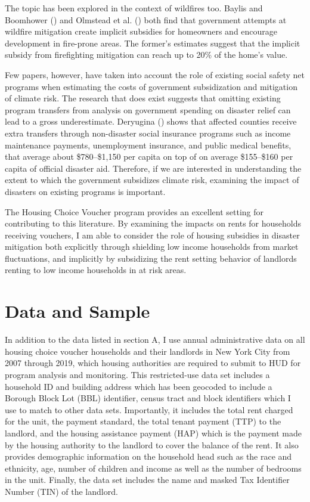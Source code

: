 \documentclass[12pt]{article}
\begin{document}
{{{{{The topic has been explored in the context of wildfires too. Baylis and Boomhower (\citeyear{baylis_moral_2019}) and Olmstead et al. (\citeyear{olmstead_wildland_2012}) both find that government attempts at wildfire mitigation create implicit subsidies for homeowners and encourage development in fire-prone areas. The former's estimates suggest that the implicit subsidy from firefighting mitigation can reach up to 20\% of the home's value.

Few papers, however, have taken into account the role of existing social safety net programs when estimating the costs of government subsidization and mitigation of climate risk. The research that does exist suggests that omitting existing program transfers from analysis on government spending on disaster relief can lead to a gross underestimate. Deryugina (\citeyear{deryugina_fiscal_2017}) shows that affected counties receive extra transfers through non-disaster social insurance programs such as income maintenance payments, unemployment insurance, and public medical benefits, that average about \$780–\$1,150 per capita on top of on average \$155–\$160 per capita of official disaster aid.  Therefore, if we are interested in understanding the extent to which the government subsidizes climate risk, examining the impact of disasters on existing programs is important.

The Housing Choice Voucher program provides an excellent setting for contributing to this literature.  By examining the impacts on rents for households receiving vouchers, I am able to consider the role of housing subsidies in disaster mitigation both explicitly through shielding low income households from market fluctuations, and implicitly by subsidizing the rent setting behavior of landlords renting to low income households in at risk areas.  

\section{Data and Sample}

In addition to the data listed in section A, I use annual administrative data on all housing choice voucher households and their landlords in New York City from 2007 through 2019, which housing authorities are required to submit to HUD for program analysis and monitoring. This restricted-use data set includes a household ID and building address which has been geocoded to include a Borough Block Lot (BBL) identifier, census tract and block identifiers which I use to match to other data sets.  Importantly, it includes the total rent charged for the unit, the payment standard, the total tenant payment (TTP) to the landlord, and the housing assistance payment (HAP) which is the payment made by the housing authority to the landlord to cover the balance of the rent.  It also provides demographic information on the household head such as the race and ethnicity, age, number of children and income as well as the number of bedrooms in the unit.  Finally, the data set includes the name and masked Tax Identifier Number (TIN) of the landlord.  

}}}}}
\end{document}
